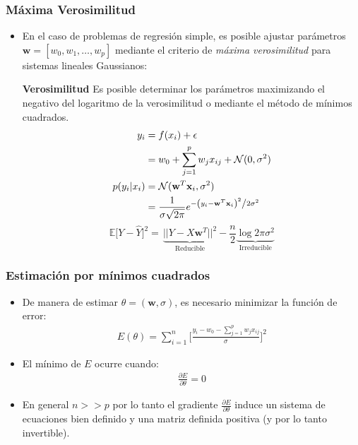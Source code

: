 \documentclass[aspectratio=169, 10pt]{beamer}
\newcommand{\E}{\mathbb{E}}
\begin{document}
\begin{frame}
\frametitle{M\'axima Verosimilitud}
\begin{itemize}
\item En el caso de problemas de regresi\'on simple, es posible ajustar par\'ametros $\mathbf w=[w_0,w_1,\ldots,w_p]$ mediante el criterio de \textit{m\'axima verosimilitud} para sistemas lineales Gaussianos:

\begin{block}{\textbf{Verosimilitud}}
	\small
	Es posible determinar los par\'ametros maximizando el negativo del logaritmo de la verosimilitud o mediante el m\'etodo de m\'inimos cuadrados.
	\begin{align*}
		y_i&=f(x_i)+\mathcal{\epsilon}\\
		&=w_0+\sum_{j=1}^{p} w_j x_{ij}+\mathcal{N} (0,\sigma^2)\\
		p(y_i \vert x_i) &= \mathcal{N} (\mathbf w^T \mathbf x_i,\sigma^2)\\  
		&= \frac{1}{{\sigma \sqrt {2\pi } }}e^{{{ - \left( {y_i - \mathbf w^T \mathbf x_{i} } \right)^2 } \mathord{\left/ {\vphantom {{ - \left( {x - \mathbf w_j \mathbf x_{ij} } \right)^2 } {2\sigma ^2 }}} \right. \kern-\nulldelimiterspace} {2\sigma ^2 }}}
	\end{align*} 
	\[
	\E\bigl[Y - \hat{Y}\bigr]^2 = \frac{}{}
	\underbrace{||Y- X\mathbf w^T||^2}_{\text{Reducible}} 
	- \frac{n}{2}\underbrace{\log{2 \pi \sigma^2}}_{\text{Irreducible}}
	\]
\end{block}
 

\end{itemize}

\end{frame}

\begin{frame}
\frametitle{Estimaci\'on por m\'inimos cuadrados}
\begin{itemize}
\item De manera de estimar $\theta=(\mathbf w,\sigma)$, es necesario minimizar la funci\'on de error: 
\begin{align}
E(\theta)=\sum_{i=1}^n \Big[ \frac{y_i-w_0-\sum_{j=1}^{p} w_j x_{ij}}{\sigma} \Big]^2
\end{align}  
\pause
\item El m\'inimo de $E$ ocurre cuando: 
\begin{align}
\frac{\partial E}{\partial \theta}=0
\end{align}
\pause
\item En general $n>>p$ por lo tanto el gradiente $\frac{\partial E}{\partial \theta}$ induce un sistema de ecuaciones bien definido y una matriz definida positiva (y por lo tanto invertible).
\end{itemize}

\end{frame}
\end{document}
